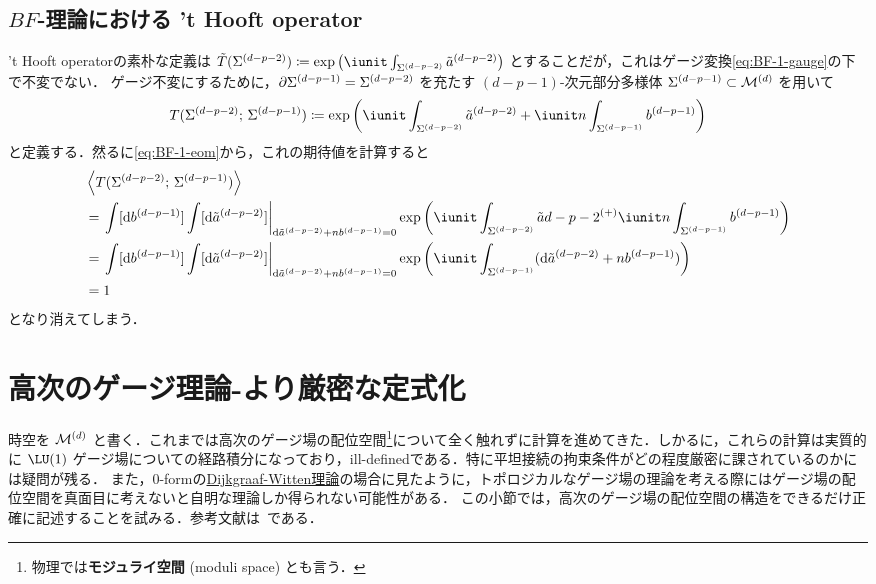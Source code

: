 \documentclass[TQFT_main]{subfiles}
\begin{document}
\subsection{$BF$-理論における 't Hooft operator}

't Hooft operatorの素朴な定義は $\tilde{T}(\mfd{\Sigma}{d-p-2}) \coloneqq \exp \left( \iunit \int_{\mfd{\Sigma}{d-p-2}} \hg{\tilde{a}}{d-p-2}\right)$ とすることだが，これはゲージ変換\eqref{eq:BF-1-gauge}の下で不変でない．
ゲージ不変にするために，$\partial \Sigma^{(d-p-1)} = \Sigma^{(d-p-2)}$ を充たす $(d-p-1)$-次元部分多様体 $\Sigma^{(d-p-1)} \subset \mathcal{M}^{(d)}$ を用いて
\begin{align}
    \label{eq:BF-1-tHooft}
    T (\mfd{\Sigma}{d-p-2};\, \mfd{\Sigma}{d-p-1}) \coloneqq \exp \left( \iunit \int_{\mfd{\Sigma}{d-p-2}} \hg{\tilde{a}}{d-p-2} + \iunit n \int_{\mfd{\Sigma}{d-p-1}} \hg{b}{d-p-1}\right) 
\end{align}
と定義する．然るに\eqref{eq:BF-1-eom}から，これの期待値を計算すると
\begin{align}
    &\expval{T (\mfd{\Sigma}{d-p-2};\, \mfd{\Sigma}{d-p-1})} \\
    &= \eval{\int [\dd{\hg{b}{d-p-1}}] \int [\dd{\hg{\tilde{a}}{d-p-2}}]}_{\dd{\hg{\tilde{a}}{d-p-2}} + n \hg{b}{d-p-1} = 0} \exp \left( \iunit \int_{\mfd{\Sigma}{d-p-2}} \hg{\tilde{a}{d-p-2}} + \iunit n \int_{\mfd{\Sigma}{d-p-1}} \hg{b}{d-p-1}\right) \\
    &= \eval{\int [\dd{\hg{b}{d-p-1}}] \int [\dd{\hg{\tilde{a}}{d-p-2}}]}_{\dd{\hg{\tilde{a}}{d-p-2}} + n \hg{b}{d-p-1} = 0} \exp \left( \iunit \int_{\mfd{\Sigma}{d-p-1}} ( \dd{\hg{\tilde{a}}{d-p-2}} + n\hg{b}{d-p-1} )\right) \\
    &= 1
\end{align}
となり消えてしまう．

\section{高次のゲージ理論-より厳密な定式化}

時空を $\mathcal{M}^{(d)}$ と書く．これまでは高次のゲージ場の配位空間\footnote{物理では\textbf{モジュライ空間} (moduli space) とも言う．}について全く触れずに計算を進めてきた．しかるに，これらの計算は実質的に $\LU(1)$ ゲージ場についての経路積分になっており，ill-definedである．特に平坦接続の拘束条件がどの程度厳密に課されているのかには疑問が残る．
また，$0$-formの\hyperref[def:Dijkgraaf-Witten]{Dijkgraaf-Witten理論}の場合に見たように，トポロジカルなゲージ場の理論を考える際にはゲージ場の配位空間を真面目に考えないと自明な理論しか得られない可能性がある．
この小節では，高次のゲージ場の配位空間の構造をできるだけ正確に記述することを試みる．参考文献は~\cite{alfonsi2023higher}である．
\end{document}
